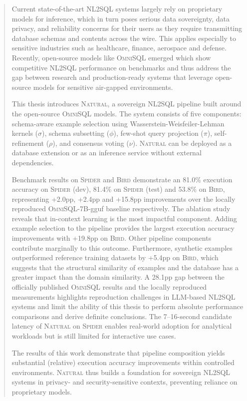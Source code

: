 \begin{abstract}

Current state-of-the-art NL2SQL systems largely rely on proprietary models
for inference, which in turn poses serious data sovereignty, data privacy, and
reliability concerns for their users as they require transmitting database
schemas and contents across the wire. This applies especially to sensitive
industries such as healthcare, finance, aerospace and defense. Recently,
open-source models like \textsc{OmniSQL} emerged which show competitive NL2SQL
performance on benchmarks and thus address the gap between research and
production-ready systems that leverage open-source models for sensitive air-gapped environments.

This thesis introduces \textsc{Natural}, a sovereign NL2SQL pipeline built
around the open-source \textsc{OmniSQL} models. The system consists of
five components: schema-aware example selection using
Wasserstein-Weisfeiler-Lehman kernels ($\sigma$), schema subsetting ($\phi$),
few-shot query projection ($\pi$), self-refinement ($\rho$), and consensus
voting ($\nu$). \textsc{Natural} can be deployed as a database extension or as
an inference service without external dependencies.

Benchmark results on \textsc{Spider} and \textsc{Bird} demonstrate an 81.0\%
execution accuracy on \textsc{Spider} (dev), 81.4\% on \textsc{Spider}
(test) and 53.8\% on \textsc{Bird}, representing +2.0pp, +2.4pp and +15.8pp
improvements over the locally reproduced \textsc{OmniSQL}-7B-gguf baseline
respectively. The ablation study reveals that in-context learning is the
most impactful component. Adding example selection to the pipeline provides the
largest execution accuracy improvements with +19.8pp on \textsc{Bird}. Other
pipeline components contribute marginally to this outcome. Furthermore,
synthetic examples outperformed reference training datasets by +5.4pp on
\textsc{Bird}, which suggests that the structural similarity of examples and
the database has a greater impact than the domain similarity. A 28.1pp gap
between the officially published \textsc{OmniSQL} results and the locally
reproduced measurements highlights reproduction challenges in LLM-based NL2SQL
systems and limit the ability of this thesis to perform absolute performance
comparisons and derive definite conclusions. The 7–16-second candidate latency
of \textsc{Natural} on \textsc{Spider} enables real-world adoption for
analytical workloads but is still limited for interactive use cases.

The results of this work demonstrate that pipeline composition yields
substantial (relative) execution accuracy improvements within controlled
environments. \textsc{Natural} thus builds a foundation for sovereign NL2SQL
systems in privacy- and security-sensitive contexts, preventing reliance on
proprietary models.

\end{abstract}
